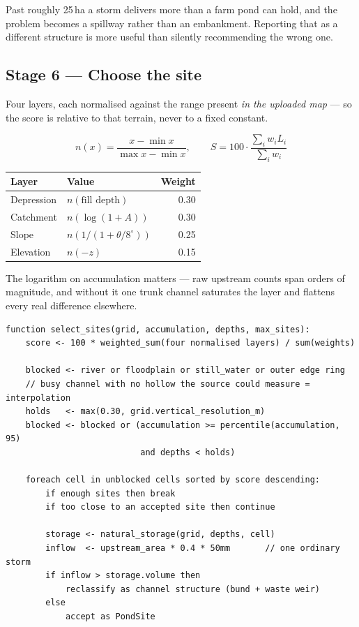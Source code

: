 \documentclass[11pt,a4paper]{article}
\newenvironment{algobox}[1]{%
  \par\addvspace{5pt}%
  \def\FrameCommand{{\color{water}\vrule width 2.5pt}\hspace{9pt}}%
  \MakeFramed{\advance\hsize-\width\FrameRestore}%
  \noindent{\small\bfseries\color{water}#1}\par\nobreak\addvspace{2pt}%
}{\par\endMakeFramed\addvspace{5pt}}
\begin{document}
Past roughly 25\,ha a storm delivers more than a farm pond can hold, and the
problem becomes a spillway rather than an embankment. Reporting that as a
different structure is more useful than silently recommending the wrong one.

\subsection{Stage 6 --- Choose the site}

Four layers, each normalised against the range present \emph{in the uploaded
map} --- so the score is relative to that terrain, never to a fixed constant.

\begin{equation}
n(x) = \frac{x - \min x}{\max x - \min x},
\qquad
S = 100 \cdot \frac{\sum_i w_i L_i}{\sum_i w_i}
\end{equation}

\begin{table}[H]
\centering\small
\begin{tabular}{@{}llr@{}}
\toprule
\textbf{Layer} & \textbf{Value} & \textbf{Weight} \\
\midrule
Depression & $n(\text{fill depth})$ & 0.30 \\
Catchment  & $n(\log(1+A))$ & 0.30 \\
Slope      & $n\!\left(1/(1+\theta/8^{\circ})\right)$ & 0.25 \\
Elevation  & $n(-z)$ & 0.15 \\
\bottomrule
\end{tabular}
\end{table}

The logarithm on accumulation matters --- raw upstream counts span orders of
magnitude, and without it one trunk channel saturates the layer and flattens
every real difference elsewhere.

\begin{algobox}{Algorithm 5 --- Score, filter, rank}
\begin{lstlisting}[style=pseudostyle]
function select_sites(grid, accumulation, depths, max_sites):
    score <- 100 * weighted_sum(four normalised layers) / sum(weights)

    blocked <- river or floodplain or still_water or outer edge ring
    // busy channel with no hollow the source could measure = interpolation
    holds   <- max(0.30, grid.vertical_resolution_m)
    blocked <- blocked or (accumulation >= percentile(accumulation, 95)
                           and depths < holds)

    foreach cell in unblocked cells sorted by score descending:
        if enough sites then break
        if too close to an accepted site then continue

        storage <- natural_storage(grid, depths, cell)
        inflow  <- upstream_area * 0.4 * 50mm       // one ordinary storm
        if inflow > storage.volume then
            reclassify as channel structure (bund + waste weir)
        else
            accept as PondSite
\end{lstlisting}
\end{algobox}
\end{document}
